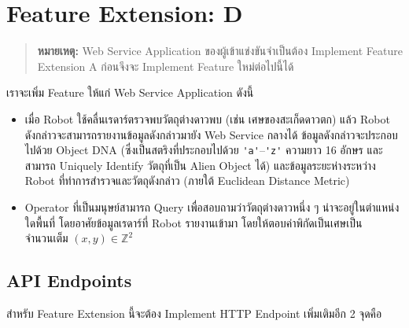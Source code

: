 
%

\section{Feature Extension: D}

\begin{quote}
  \footnotesize
  \textbf{หมายเหตุ:} Web Service Application ของผู้เข้าแข่งขันจำเป็นต้อง Implement Feature Extension A ก่อนจึงจะ Implement Feature ใหม่ต่อไปนี้ได้
\end{quote}

\noindent
เราจะเพิ่ม Feature ให้แก่ Web Service Application ดังนี้
\begin{itemize}[topsep=0pc,itemsep=0pc]
\item  
    เมื่อ Robot ใช้คลื่นเรดาร์ตรวจพบวัตถุต่างดาวพบ (เช่น เศษของสะเก็ดดาวตก) แล้ว Robot ดังกล่าวจะสามารถรายงานข้อมูลดังกล่าวมายัง Web Service กลางได้ \;
    ข้อมูลดังกล่าวจะประกอบไปด้วย Object DNA (ซึ่งเป็นสตริงที่ประกอบไปด้วย \lstinline{'a'}–\lstinline{'z'} ความยาว 16 อักษร และสามารถ Uniquely Identify วัตถุที่เป็น Alien Object ได้) และข้อมูลระยะห่างระหว่าง Robot ที่ทำการสำรวจและวัตถุดังกล่าว (ภายใต้ Euclidean Distance Metric)
\item 
    Operator ที่เป็นมนุษย์สามารถ Query เพื่อสอบถามว่าวัตถุต่างดาวหนึ่ง ๆ น่าจะอยู่ในตำแหน่งใดพื้นที่ โดยอาศัยข้อมูลเรดาร์ที่ Robot รายงานเข้ามา \; โดยให้ตอบค่าพิกัดเป็นเศษเป็นจำนวนเต็ม $(x, y) \in \mathbb{Z}^2$
\end{itemize}

\subsection{API Endpoints}

\noindent
สำหรับ Feature Extension นี้จะต้อง Implement HTTP Endpoint เพิ่มเติมอีก 2 จุดคือ

